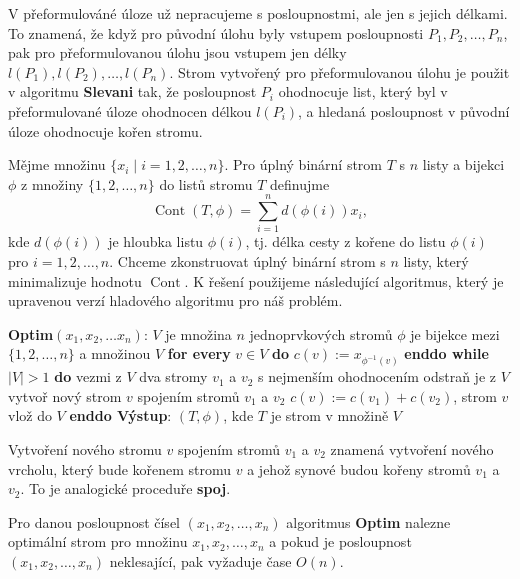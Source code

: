 \documentclass[a4paper,12pt]{article}
\DeclareMathOperator*{\Cont}{Cont}
\begin{document}
V přeformulováné úloze už nepracujeme s 
posloupnostmi, ale jen s jejich délkami. 
To znamená, že když pro původní úlohu 
byly vstupem posloupnosti $P_1,P_2,\dots,
P_n$, pak pro 
přeformulovanou úlohu jsou vstupem jen délky  
$l(P_1),l(P_2),\dots,l(P_n)$. Strom vytvořený pro 
přeformulovanou úlohu  
je použit v algoritmu {\bf Slevani}  
tak, že  posloupnost $P_i$ ohodnocuje list, který byl v 
přeformulované úloze ohodnocen délkou $l(P_i)$, a hledaná posloupnost 
v původní úloze ohodnocuje kořen stromu. 

Mějme množinu $\{x_i\mid i=1,2,\dots,n\}$.  Pro úplný binární 
strom $T$ s $n$ listy a bijekci $\phi$ z množiny $\{1,2,\dots,
n\}$ do 
listů stromu $T$ definujme 
$$\Cont(T,\phi )=\sum_{i=1}^nd(\phi (i))x_i,$$
kde $d(\phi (i))$ je hloubka listu $\phi (i)$, tj.  délka cesty z 
kořene do listu $\phi (i)$  pro $i=1,2,\dots,n$.  
Chceme zkonstruovat úplný binární strom s $n$ listy, 
který minimalizuje hodnotu $\Cont$. K řešení 
použijeme následující algoritmus, který je upravenou verzí 
hladového algoritmu pro náš problém.

{\bf Optim$(x_1,x_2,\dots x_n)$}:\newline 
$V$ je množina $n$ jednoprvkových stromů\newline 
$\phi$ je bijekce mezi $\{1,2,\dots,n\}$ a množinou $V$\newline 
{\bf for every} $v\in V$ {\bf do} $c(v):=x_{\phi^{-1}(v)}$ {\bf enddo\newline 
while} $|V|>1$ {\bf do\newline 
\phantom{{\rm---}}}vezmi z $V$ dva stromy $v_1$ a $v_2$ s nejmenším ohodnocením\newline 
\phantom{---}odstraň je z $V$\newline 
\phantom{---}vytvoř nový strom $v$ spojením stromů $
v_1$ a $v_2$\newline 
\phantom{---}$c(v):=c(v_1)+c(v_2)$, strom $v$ vlož do $V$\newline 
{\bf enddo\newline 
Výstup}: $(T,\phi )$, kde $T$ je strom v množině $V$

Vytvoření nového stromu $v$ spojením stromů 
$v_1$ a $v_2$ znamená vytvoření nového vrcholu, který bude 
kořenem stromu $v$ a jehož synové budou kořeny stromů 
$v_1$ a $v_2$. To je analogické proceduře {\bf spoj}.

\begin{veta}Pro danou posloupnost čísel 
$(x_1,x_2,\dots,x_n)$ algoritmus {\bf Optim} nalezne optimální strom 
pro množinu $x_1,x_2,\dots,x_n$ a pokud je posloupnost 
$(x_1,x_2,\dots,x_n)$ neklesající, pak vyža\-du\-je čase 
$O(n)$.  
\end{veta}
\end{document}
